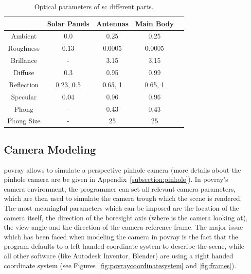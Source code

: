 \begin{table}[htbp]
  \centering
  \begin{tabular}{c cccc}
    \hline
    \hline
               & Solar Panels & Antennas  & Main Body \\
    \hline
    Ambient    & 0.0          & 0.25      & 0.25      \\
    Roughness  & 0.13         & 0.0005    & 0.0005    \\
    Brillance  & -            & 3.15      & 3.15      \\
    Diffuse    & 0.3          & 0.95      & 0.99      \\
    Reflection & {0.23, 0.5}  & {0.65, 1} & {0.65, 1} \\
    Specular   & 0.04         & 0.96      & 0.96      \\
    Phong      & -            & 0.43      & 0.43      \\
    Phong Size & -            & 25        & 25        \\
    \hline
    \hline
  \end{tabular}
  \caption{Optical parameters of \acrshort{sc} different parts.}
  \label{tab:SCParameters}
\end{table}

\subsection{Camera Modeling}
\acrshort{povray} allows to simulate a perspective pinhole camera (more details about the pinhole camera are be given in Appendix~\ref{subsection:pinhole}). In \acrshort{povray}'s camera environment, the programmer can set all relevant camera parameters, which are then used to simulate the camera trough which the scene is rendered.
The most meaningful parameters which can be imposed are the location of the camera itself, the direction of the boresight axis (where is the camera looking at), the view angle and the direction of the camera reference frame. The major issue which has been faced when modeling the camera in \acrshort{povray} is the fact that the program defaults to a left handed coordinate system to describe the scene, while all other software (like Autodesk Inventor, Blender) are using a right handed coordinate system (see Figures~\ref{fig:povraycoordinatesystem} and \ref{fig:frames}).

